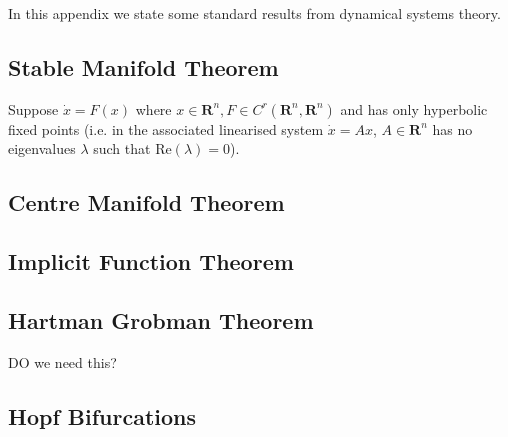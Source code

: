 In this appendix we state some standard results from dynamical systems theory.
\subsection{Stable Manifold Theorem}
Suppose $\dot{x} = F(x)$ where $x\in \mathbf{R}^n, F\in C^r(\mathbf{R}^n,\mathbf{R}^n)$ and has only hyperbolic fixed points (i.e. in the associated linearised system $\dot{x}=Ax$, $A\in \mathbf{R}^n$ has no eigenvalues $\lambda$ such that $\mathrm{Re}(\lambda)=0$). 
\subsection{Centre Manifold Theorem}
\subsection{Implicit Function Theorem}
\subsection{Hartman Grobman Theorem}
DO we need this?
\subsection{Hopf Bifurcations}